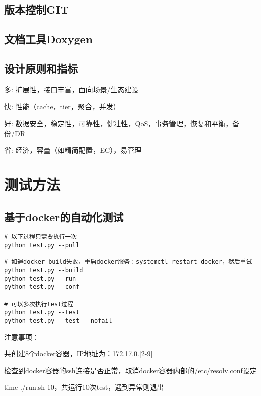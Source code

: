 \subsection{版本控制GIT}

\subsection{文档工具Doxygen}


\subsection{设计原则和指标}

\begin{itembox}
\item 多: 扩展性，接口丰富，面向场景/生态建设
\item 快: 性能（cache，tier，聚合，并发）
\item 好: 数据安全，稳定性，可靠性，健壮性，QoS，事务管理，恢复和平衡，备份/DR
\item 省: 经济，容量（如精简配置，EC），易管理
\end{itembox}

\section{测试方法}

\subsection{基于docker的自动化测试}

\begin{lstlisting}
# 以下过程只需要执行一次
python test.py --pull

# 如遇docker build失败，重启docker服务：systemctl restart docker，然后重试
python test.py --build
python test.py --run
python test.py --conf

# 可以多次执行test过程
python test.py --test
python test.py --test --nofail
\end{lstlisting}

注意事项：
\begin{compactenum}
\item 共创建8个docker容器，IP地址为：172.17.0.[2-9]
\item 检查到docker容器的ssh连接是否正常，取消docker容器内部的/etc/resolv.conf设定
\item time ./run.sh 10，共运行10次test，遇到异常则退出
\end{compactenum}

